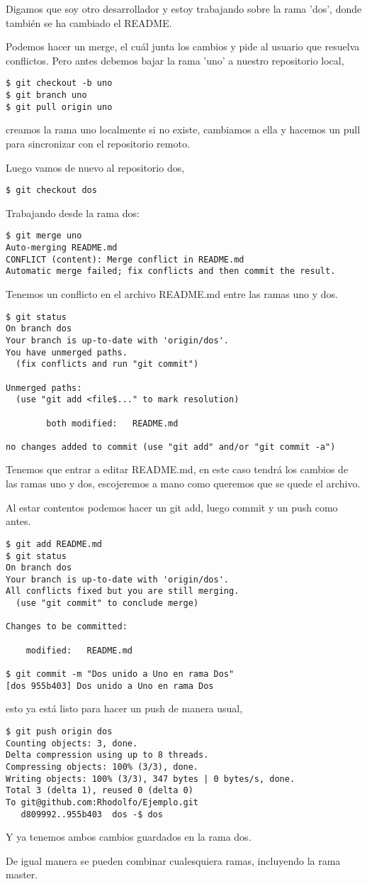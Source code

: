\documentclass{article}
\begin{document}
Digamos que soy otro desarrollador y estoy trabajando sobre la rama 'dos',
donde tambi\'{e}n se ha cambiado el README.

Podemos hacer un merge, el cu\'{a}l
junta los cambios y pide al usuario que resuelva conflictos.
Pero antes debemos bajar la rama 'uno' a nuestro repositorio local,
\begin{verbatim}
$ git checkout -b uno 
$ git branch uno
$ git pull origin uno
\end{verbatim}
creamos la rama uno localmente si no existe, cambiamos a ella
y hacemos un pull para sincronizar con el repositorio remoto.

Luego vamos de nuevo al repositorio dos,
\begin{verbatim}
$ git checkout dos
\end{verbatim}

Trabajando desde la rama dos:
\begin{verbatim}
$ git merge uno
Auto-merging README.md
CONFLICT (content): Merge conflict in README.md
Automatic merge failed; fix conflicts and then commit the result.
\end{verbatim}

Tenemos un conflicto en el archivo README.md entre las ramas uno y dos.
\begin{verbatim}
$ git status 
On branch dos
Your branch is up-to-date with 'origin/dos'.
You have unmerged paths.
  (fix conflicts and run "git commit")

Unmerged paths:
  (use "git add <file$..." to mark resolution)

        both modified:   README.md

no changes added to commit (use "git add" and/or "git commit -a")
\end{verbatim}
Tenemos que entrar a editar README.md, 
en este caso tendr\'{a} los cambios de las ramas uno y dos,
escojeremos a mano como queremos que se quede el archivo.  

Al estar contentos podemos hacer un git add, luego commit y un push como antes.
\begin{verbatim}
$ git add README.md 
$ git status
On branch dos
Your branch is up-to-date with 'origin/dos'.
All conflicts fixed but you are still merging.
  (use "git commit" to conclude merge)

Changes to be committed:

	modified:   README.md

$ git commit -m "Dos unido a Uno en rama Dos" 
[dos 955b403] Dos unido a Uno en rama Dos
\end{verbatim}
esto ya est\'{a} listo para hacer un push de manera usual,
\begin{verbatim}
$ git push origin dos
Counting objects: 3, done.
Delta compression using up to 8 threads.
Compressing objects: 100% (3/3), done.
Writing objects: 100% (3/3), 347 bytes | 0 bytes/s, done.
Total 3 (delta 1), reused 0 (delta 0)
To git@github.com:Rhodolfo/Ejemplo.git
   d809992..955b403  dos -$ dos
\end{verbatim}
Y ya tenemos ambos cambios guardados en la rama dos.

De igual manera se pueden combinar cualesquiera ramas, incluyendo la rama master.
\end{document}
